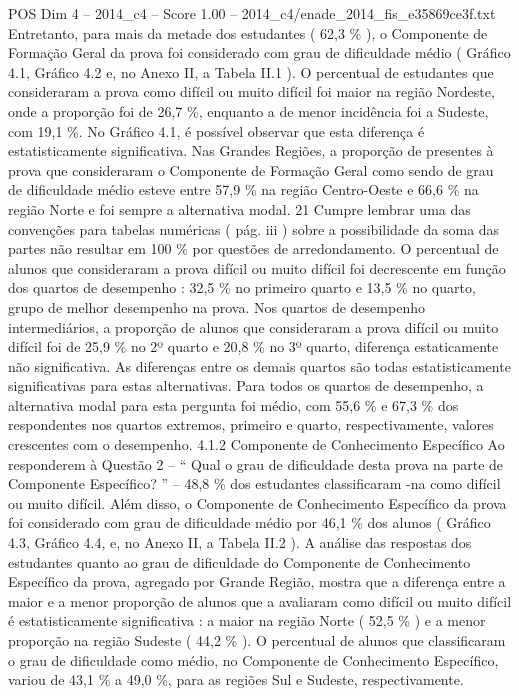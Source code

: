 \begin{textsample}{POS Dim 4 – 2014\_c4 – Score 1.00 – 2014\_c4/enade\_2014\_fis\_e35869ce3f.txt}
Entretanto, para mais da metade dos estudantes ( 62,3 \% ), o Componente de Formação Geral da prova foi considerado com grau de dificuldade médio ( Gráfico 4.1, Gráfico 4.2 e, no Anexo II, a Tabela II.1 ).
O percentual de estudantes que consideraram a prova como difícil ou muito difícil foi maior na região Nordeste, onde a proporção foi de 26,7 \%, enquanto a de menor incidência foi a Sudeste, com 19,1 \%.
No Gráfico 4.1, é possível observar que esta diferença é estatisticamente significativa.
Nas Grandes Regiões, a proporção de presentes à prova que consideraram o Componente de Formação Geral como sendo de grau de dificuldade médio esteve entre 57,9 \% na região Centro-Oeste e 66,6 \% na região Norte e foi sempre a alternativa modal. 21 Cumpre lembrar uma das convenções para tabelas numéricas ( pág. iii ) sobre a possibilidade da soma das partes não resultar em 100 \% por questões de arredondamento.
O percentual de alunos que consideraram a prova difícil ou muito difícil foi decrescente em função dos quartos de desempenho : 32,5 \% no primeiro quarto e 13,5 \% no quarto, grupo de melhor desempenho na prova.
Nos quartos de desempenho intermediários, a proporção de alunos que consideraram a prova difícil ou muito difícil foi de 25,9 \% no 2º quarto e 20,8 \% no 3º quarto, diferença estaticamente não significativa.
As diferenças entre os demais quartos são todas estatisticamente significativas para estas alternativas.
Para todos os quartos de desempenho, a alternativa modal para esta pergunta foi médio, com 55,6 \% e 67,3 \% dos respondentes nos quartos extremos, primeiro e quarto, respectivamente, valores crescentes com o desempenho. 4.1.2 Componente de Conhecimento Específico Ao responderem à Questão 2 – “ Qual o grau de dificuldade desta prova na parte de Componente Específico? ” – 48,8 \% dos estudantes classificaram -na como difícil ou muito difícil.
Além disso, o Componente de Conhecimento Específico da prova foi considerado com grau de dificuldade médio por 46,1 \% dos alunos ( Gráfico 4.3, Gráfico 4.4, e, no Anexo II, a Tabela II.2 ).
A análise das respostas dos estudantes quanto ao grau de dificuldade do Componente de Conhecimento Específico da prova, agregado por Grande Região, mostra que a diferença entre a maior e a menor proporção de alunos que a avaliaram como difícil ou muito difícil é estatisticamente significativa : a maior na região Norte ( 52,5 \% ) e a menor proporção na região Sudeste ( 44,2 \% ).
O percentual de alunos que classificaram o grau de dificuldade como médio, no Componente de Conhecimento Específico, variou de 43,1 \% a 49,0 \%, para as regiões Sul e Sudeste, respectivamente.

\end{textsample}
